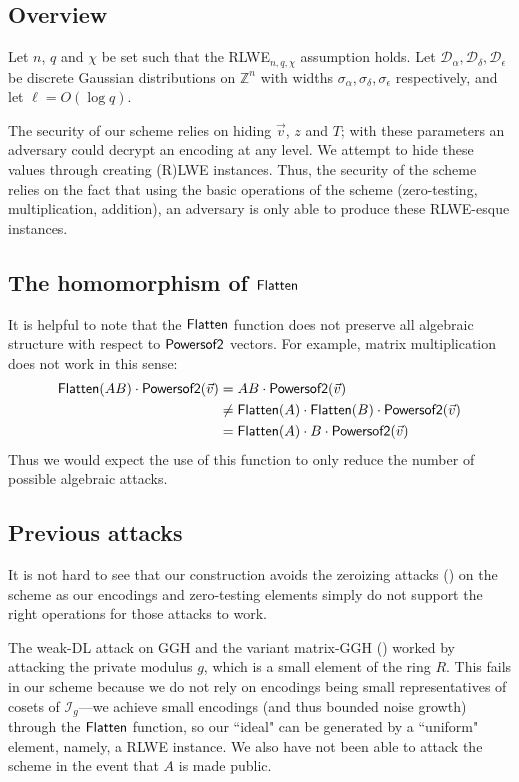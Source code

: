 \subsection{Overview}

Let $n$, $q$ and $\chi$ be set such that the RLWE$_{n,q,\chi}$ assumption holds.  Let $\mathcal{D}_\alpha, \mathcal{D}_\delta, \mathcal{D}_\epsilon$ be discrete Gaussian distributions on $\mathbb{Z}^n$ with widths $\sigma_\alpha, \sigma_\delta, \sigma_\epsilon$ respectively, and let $\ell = O(\log q)$.  

The security of our scheme relies on hiding $\vec{v}$, $z$ and $T$; with these parameters an adversary could decrypt an encoding at any level.  We attempt to hide these values through creating (R)LWE instances.  Thus, the security of the scheme relies on the fact that using the basic operations of the scheme (zero-testing, multiplication, addition), an adversary is only able to produce these RLWE-esque instances.  

\subsection{The homomorphism of $\mathsf{Flatten}$}

It is helpful to note that the $\mathsf{Flatten}$ function does not preserve all algebraic structure with respect to $\mathsf{Powersof2}$ vectors.  For example, matrix multiplication does not work in this sense:
\begin{align*}
\mathsf{Flatten}(AB)\cdot \mathsf{Powersof2}(\vec{v}) &= AB \cdot \mathsf{Powersof2}(\vec{v})\\
&\not= \mathsf{Flatten}(A)\cdot \mathsf{Flatten}(B)\cdot \mathsf{Powersof2}(\vec{v})\\ 
&= \mathsf{Flatten}(A)\cdot B\cdot \mathsf{Powersof2}(\vec{v})
\end{align*}
Thus we would expect the use of this function to only reduce the number of possible algebraic attacks.

\subsection{Previous attacks}
It is not hard to see that our construction avoids the zeroizing attacks (\cite{chl}) on the \cite{clt} scheme as our encodings and zero-testing elements simply do not support the right operations for those attacks to work.

The weak-DL attack on GGH and the variant matrix-GGH (\cite{cgh, hj}) worked by attacking the private modulus $g$, which is a small element of the ring $R$.  This fails in our scheme because we do not rely on encodings being small representatives of cosets of $\mathcal{I}_g$---we achieve small encodings (and thus bounded noise growth) through the $\mathsf{Flatten}$ function, so our ``ideal" can be generated by a ``uniform" element, namely, a RLWE instance.  We also have not been able to attack the scheme in the event that $A$ is made public.

